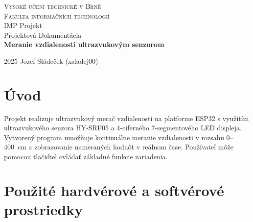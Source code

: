 \documentclass[a4paper, 11pt]{article}
\begin{document}
\begin{titlepage}
\begin{center}
\Huge
\textsc{Vysoké učení technické v Brně} \\ [0.3em]
\huge
\textsc{Fakulta informačních technologií} \\
\huge
IMP Projekt\\[0.2em]
\LARGE
Projektová Dokumentácia\\[0.1em]
\Large
\textbf{Meranie vzdialenosti ultrazvukovým senzorom}\\
\end{center}
{\Large 2025 \hfill
Jozef Sládeček (xsladej00)}
\end{titlepage}

\clearpage
{}

\newpage

\section{Úvod}

Projekt realizuje ultrazvukový merač vzdialenosti na platforme ESP32 s využitím ultrazvukového senzora HY-SRF05 a 4-ciferného 7-segmentového LED displeja. Vytvorený program umožňuje kontinuálne meranie vzdialenosti v rozsahu 0--400~cm a zobrazovanie nameraných hodnôt v reálnom čase. Používateľ môže pomocou tlačidiel ovládať základné funkcie zariadenia.

\section{Použité hardvérové a softvérové prostriedky}
\end{document}
